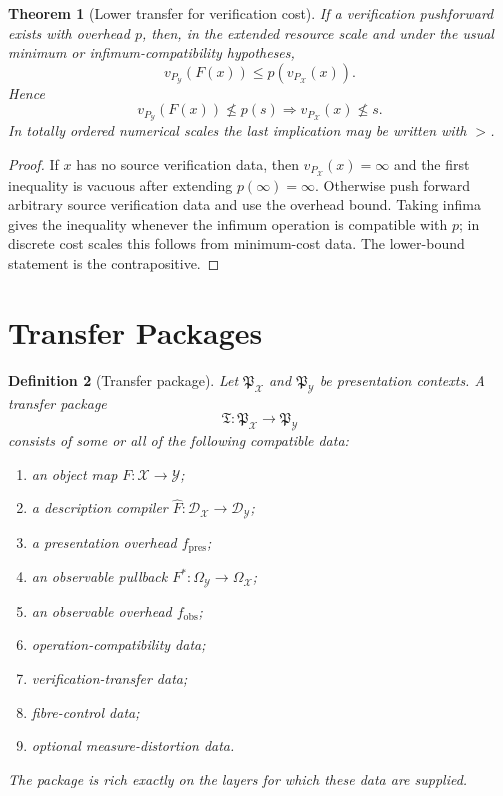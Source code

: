 \documentclass[11pt]{article}
\newtheorem{theorem}{Theorem}[section]
\newtheorem{definition}[theorem]{Definition}
\begin{document}
\begin{theorem}[Lower transfer for verification cost]
If a verification pushforward exists with overhead \(p\), then, in the extended resource scale and under the usual minimum or infimum-compatibility hypotheses,
\[
v_{P_\mathcal Y}(F(x))
\leq
p(v_{P_\mathcal X}(x)).
\]
Hence
\[
v_{P_\mathcal Y}(F(x))\nleq p(s)
\Longrightarrow
v_{P_\mathcal X}(x)\nleq s.
\]
In totally ordered numerical scales the last implication may be written with \(>\).
\end{theorem}

\begin{proof}
If \(x\) has no source verification data, then \(v_{P_\mathcal X}(x)=\infty\) and the first inequality is vacuous after extending \(p(\infty)=\infty\). Otherwise push forward arbitrary source verification data and use the overhead bound. Taking infima gives the inequality whenever the infimum operation is compatible with \(p\); in discrete cost scales this follows from minimum-cost data. The lower-bound statement is the contrapositive.
\end{proof}

\section{Transfer Packages}

\begin{definition}[Transfer package]
Let \(\mathfrak P_\mathcal X\) and \(\mathfrak P_\mathcal Y\) be presentation contexts. A transfer package
\[
\mathfrak T:\mathfrak P_\mathcal X\to\mathfrak P_\mathcal Y
\]
consists of some or all of the following compatible data:
\begin{enumerate}[label=(\roman*)]
\item an object map \(F:\mathcal X\to\mathcal Y\);
\item a description compiler \(\widehat F:\mathcal D_\mathcal X\to\mathcal D_\mathcal Y\);
\item a presentation overhead \(f_{\mathrm{pres}}\);
\item an observable pullback \(F^\ast:\Omega_\mathcal Y\to\Omega_\mathcal X\);
\item an observable overhead \(f_{\mathrm{obs}}\);
\item operation-compatibility data;
\item verification-transfer data;
\item fibre-control data;
\item optional measure-distortion data.
\end{enumerate}
The package is rich exactly on the layers for which these data are supplied.
\end{definition}
\end{document}
